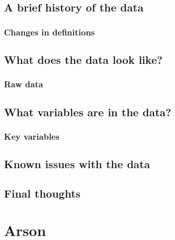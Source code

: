 \documentclass[
  12pt,
  openany]{book}
\begin{document}
\hypertarget{a-brief-history-of-the-data-2}{%
\section{A brief history of the data}\label{a-brief-history-of-the-data-2}}

\hypertarget{changes-in-definitions-2}{%
\subsection{Changes in definitions}\label{changes-in-definitions-2}}

\hypertarget{what-does-the-data-look-like-2}{%
\section{What does the data look like?}\label{what-does-the-data-look-like-2}}

\hypertarget{raw-data-1}{%
\subsection{Raw data}\label{raw-data-1}}

\hypertarget{what-variables-are-in-the-data-2}{%
\section{What variables are in the data?}\label{what-variables-are-in-the-data-2}}

\hypertarget{key-variables-2}{%
\subsection{Key variables}\label{key-variables-2}}

\hypertarget{known-issues-with-the-data-2}{%
\section{Known issues with the data}\label{known-issues-with-the-data-2}}

\hypertarget{final-thoughts-2}{%
\section{Final thoughts}\label{final-thoughts-2}}

\hypertarget{arson-1}{%
\chapter{Arson}\label{arson-1}}
\end{document}
